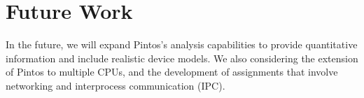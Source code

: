 \section{Future Work}

In the future, we will expand Pintos's analysis capabilities to
provide quantitative information  and include realistic
device models.
We also considering the extension of Pintos to multiple
CPUs, and the development of assignments that involve
networking and interprocess communication (IPC).
